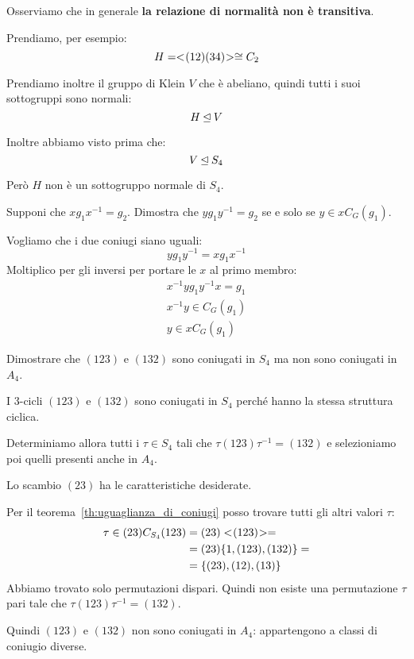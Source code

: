 Osserviamo che in generale \textbf{la relazione di normalità non è transitiva}.

Prendiamo, per esempio:
\begin{equation*}
	H = < \negmedspace (12)(34) \negmedspace > \cong C_2
\end{equation*}

Prendiamo inoltre il gruppo di Klein $V$ che è abeliano, quindi tutti i suoi sottogruppi sono normali:
\begin{equation}
	H \unlhd V
\end{equation}

Inoltre abbiamo visto prima che:
\begin{equation}
	V \unlhd S_4
\end{equation}

Però $H$ non è un sottogruppo normale di $S_4$.

\begin{teorema}
	\label{th:uguaglianza_di_coniugi}
	Supponi che $xg_1 x^{-1} = g_2$.
	Dimostra che $y g_1 y^{-1} = g_2$ se e solo se $y \in x C_G(g_1)$.
\end{teorema}
\begin{dimostrazione}
	Vogliamo che i due coniugi siano uguali:
	\begin{equation}
		y g_1 y^{-1} = x g_1 x^{-1}
	\end{equation}
	Moltiplico per gli inversi per portare le $x$ al primo membro:
	\begin{gather}
		x^{-1} y g_1 y^{-1} x = g_1 \\
		x^{-1} y \in C_G(g_1) \\
		y \in x C_G(g_1)
	\end{gather}
\end{dimostrazione}

\begin{esercizio}
	\label{th:non_coniugati_in_a4}
	Dimostrare che $(123)$ e $(132)$ sono coniugati in $S_4$ ma non sono coniugati in $A_4$.
\end{esercizio}
\begin{soluzione}
	I 3-cicli $(123)$ e $(132)$ sono coniugati in $S_4$ perché hanno la stessa struttura ciclica.

	Determiniamo allora tutti i $\tau \in S_4$ tali che $\tau (123) \tau^{-1} = (132)$ e selezioniamo poi quelli
	presenti anche in $A_4$.

	Lo scambio $(23)$ ha le caratteristiche desiderate.

	Per il teorema~\ref{th:uguaglianza_di_coniugi} posso trovare tutti gli altri valori $\tau$:
	\begin{align}
		\tau \in (23) C_{S_4}(123) &= (23) < \negmedspace (123) \negmedspace > = \\
		&= (23)\{1, (123), (132)\} = \\
		&= \{(23), (12), (13)\}
	\end{align}
	Abbiamo trovato solo permutazioni dispari.
	Quindi non esiste una permutazione $\tau$ pari tale che $\tau (123) \tau^{-1} = (132)$.

	Quindi $(123)$ e $(132)$ non sono coniugati in $A_4$: appartengono a classi di coniugio diverse.
\end{soluzione}

